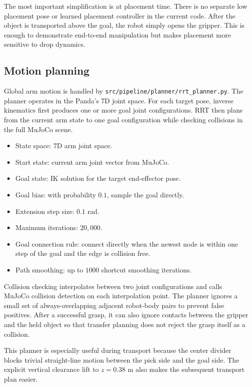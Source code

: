 \documentclass[11pt]{article}
\begin{document}
The most important simplification is at placement time. There is no separate low placement pose or learned placement controller in the current code. After the object is transported above the goal, the robot simply opens the gripper. This is enough to demonstrate end-to-end manipulation but makes placement more sensitive to drop dynamics.

\subsection{Motion planning}

Global arm motion is handled by \texttt{src/pipeline/planner/rrt\_planner.py}. The planner operates in the Panda's 7D joint space. For each target pose, inverse kinematics first produces one or more goal joint configurations. RRT then plans from the current arm state to one goal configuration while checking collisions in the full MuJoCo scene.

\begin{itemize}[leftmargin=*]
    \item State space: 7D arm joint space.
    \item Start state: current arm joint vector from MuJoCo.
    \item Goal state: IK solution for the target end-effector pose.
    \item Goal bias: with probability \(0.1\), sample the goal directly.
    \item Extension step size: \(0.1\) rad.
    \item Maximum iterations: \(20{,}000\).
    \item Goal connection rule: connect directly when the newest node is within one step of the goal and the edge is collision free.
    \item Path smoothing: up to \(1000\) shortcut smoothing iterations.
\end{itemize}

Collision checking interpolates between two joint configurations and calls MuJoCo collision detection on each interpolation point. The planner ignores a small set of always-overlapping adjacent robot-body pairs to prevent false positives. After a successful grasp, it can also ignore contacts between the gripper and the held object so that transfer planning does not reject the grasp itself as a collision.

This planner is especially useful during transport because the center divider blocks trivial straight-line motion between the pick side and the goal side. The explicit vertical clearance lift to \(z=0.38\) m also makes the subsequent transport plan easier.
\end{document}
